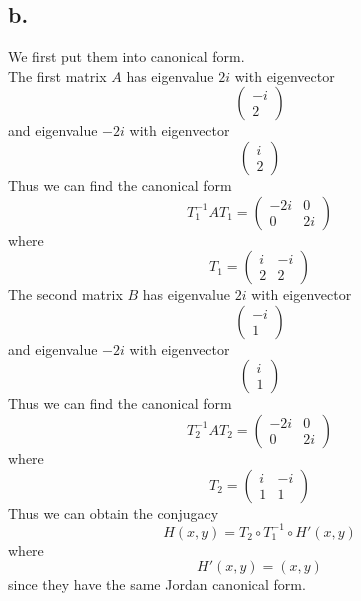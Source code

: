 \documentclass[11pt]{article}
\theoremstyle{mystyle}
\theoremstyle{definition}
\begin{document}
\subsection*{b.}
We first put them into canonical form. \\
The first matrix $A$ has eigenvalue $2i$ with eigenvector 
\[
  \begin{pmatrix}
    -i \\
    2
  \end{pmatrix}
\]
and eigenvalue $-2i$ with eigenvector 
\[
  \begin{pmatrix}
    i \\ 
    2
  \end{pmatrix}
\]
Thus we can find the canonical form 
\[
 T_1^{-1}A T_1 = \begin{pmatrix}
  -2i & 0 \\
  0 & 2i
\end{pmatrix}  
\]
where 
\[
  T_1 = 
  \begin{pmatrix}
    i & -i \\
    2 & 2
  \end{pmatrix}
\]
The second matrix $B$ has eigenvalue $2i$ with eigenvector 
\[
  \begin{pmatrix}
    -i \\
    1
  \end{pmatrix}
\]
and eigenvalue $-2i$ with eigenvector 
\[
  \begin{pmatrix}
    i \\ 
    1
  \end{pmatrix}
\]
Thus we can find the canonical form 
\[
  T_2^{-1} A T_2 = \begin{pmatrix}
  -2i & 0 \\
  0 & 2i
\end{pmatrix}  
\]
where 
\[
  T_2 = 
  \begin{pmatrix}
    i & -i \\
    1 & 1
  \end{pmatrix}
\]
Thus we can obtain the conjugacy
\[
  H(x,y) = T_2 \circ T_1^{-1} \circ H'(x,y)
\]
where 
\[
  H'(x,y) = (x,y)
\]
since they have the same Jordan canonical form. 
\clearpage
\end{document}
